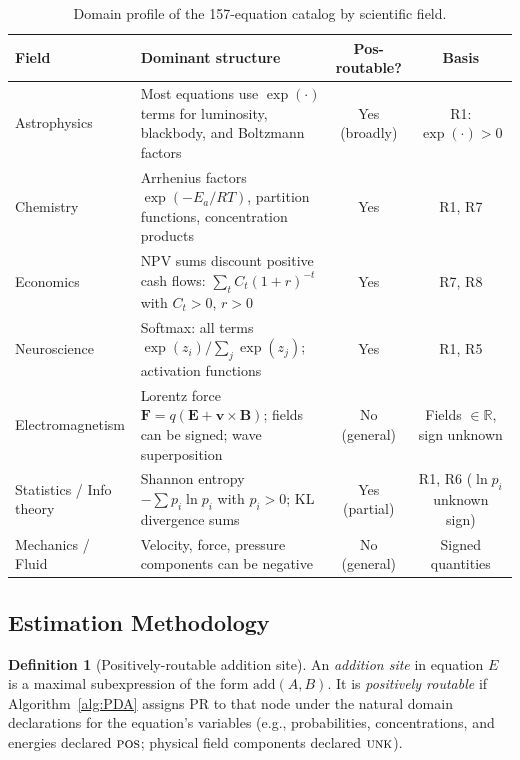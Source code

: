 \documentclass[12pt,a4paper]{article}
\theoremstyle{definition}
\newtheorem{definition}[theorem]{Definition}
\newcommand{\POS}{\textsc{pos}}
\newcommand{\UNK}{\textsc{unk}}
\begin{document}
\begin{table}[h]
\centering
\caption{Domain profile of the 157-equation catalog by scientific field.}
\label{tab:domains}
\smallskip
\begin{tabular}{@{}L{3.5cm}L{6.2cm}cc@{}}
\toprule
\textbf{Field} & \textbf{Dominant structure} &
  \textbf{Pos-routable?} & \textbf{Basis} \\
\midrule
Astrophysics
  & Most equations use $\exp(\cdot)$ terms for luminosity,
    blackbody, and Boltzmann factors
  & Yes (broadly)
  & R1: $\exp(\cdot)>0$ \\[4pt]
Chemistry
  & Arrhenius factors $\exp(-E_a/RT)$, partition functions,
    concentration products
  & Yes
  & R1, R7 \\[4pt]
Economics
  & NPV sums discount positive cash flows: $\sum_{t} C_t(1+r)^{-t}$
    with $C_t > 0$, $r > 0$
  & Yes
  & R7, R8 \\[4pt]
Neuroscience
  & Softmax: all terms $\exp(z_i)/\sum_j \exp(z_j)$;
    activation functions
  & Yes
  & R1, R5 \\[4pt]
Electromagnetism
  & Lorentz force $\mathbf{F} = q(\mathbf{E}+\mathbf{v}\times\mathbf{B})$;
    fields can be signed; wave superposition
  & No (general)
  & Fields $\in\mathbb{R}$, sign unknown \\[4pt]
Statistics / Info theory
  & Shannon entropy $-\sum p_i \ln p_i$ with $p_i>0$; KL divergence sums
  & Yes (partial)
  & R1, R6 ($\ln p_i$ unknown sign) \\[4pt]
Mechanics / Fluid
  & Velocity, force, pressure components can be negative
  & No (general)
  & Signed quantities \\
\bottomrule
\end{tabular}
\end{table}

\subsection{Estimation Methodology}

\begin{definition}[Positively-routable addition site]
\label{def:PR-site}
An \emph{addition site} in equation $E$ is a maximal subexpression of the form
$\mathrm{add}(A, B)$.  It is \emph{positively routable} if Algorithm~\ref{alg:PDA}
assigns $\mathrm{PR}$ to that node under the natural domain declarations for
the equation's variables (e.g., probabilities, concentrations, and energies
declared $\POS$; physical field components declared $\UNK$).
\end{definition}
\end{document}
